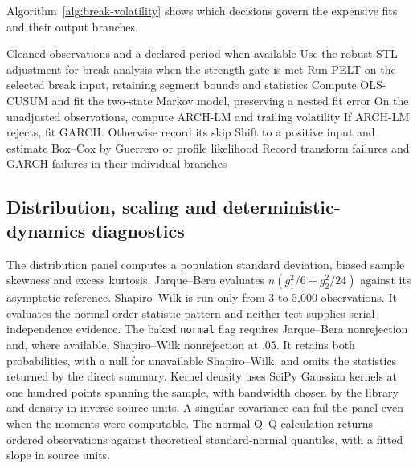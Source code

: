 Algorithm~\ref{alg:break-volatility} shows which decisions govern
the expensive fits and their output branches.
\begin{algorithm}[htbp]
\caption{Dispatch structural-break and volatility computations with their separate input transformations and eligibility decisions.}
\label{alg:break-volatility}
\begin{algorithmic}[1]
\Require Cleaned observations and a declared period when available
\State Use the robust-STL adjustment for break analysis when the strength gate is met
\State Run PELT on the selected break input, retaining segment bounds and statistics
\State Compute OLS-CUSUM and fit the two-state Markov model, preserving a nested fit error
\State On the unadjusted observations, compute ARCH-LM and trailing volatility
\State If ARCH-LM rejects, fit GARCH. Otherwise record its skip
\State Shift to a positive input and estimate Box--Cox by Guerrero or profile likelihood
\State Record transform failures and GARCH failures in their individual branches
\end{algorithmic}
\end{algorithm}

\subsection{Distribution, scaling and deterministic-dynamics diagnostics}
\label{sec:diagnostic-complexity}
The distribution panel computes a population standard deviation, biased sample skewness and excess kurtosis. Jarque--Bera evaluates $n(g_1^2/6+g_2^2/24)$ against its asymptotic reference. Shapiro--Wilk is run only from 3 to 5,000 observations. It evaluates the normal order-statistic pattern and neither test supplies serial-independence evidence. The baked \texttt{normal} flag requires Jarque--Bera nonrejection and, where available, Shapiro--Wilk nonrejection at .05. It retains both probabilities, with a null for unavailable Shapiro--Wilk, and omits the statistics returned by the direct summary. Kernel density uses SciPy Gaussian kernels at one hundred points spanning the sample, with bandwidth chosen by the library and density in inverse source units. A singular covariance can fail the panel even when the moments were computable. The normal Q--Q calculation returns ordered observations against theoretical standard-normal quantiles, with a fitted slope in source units.

